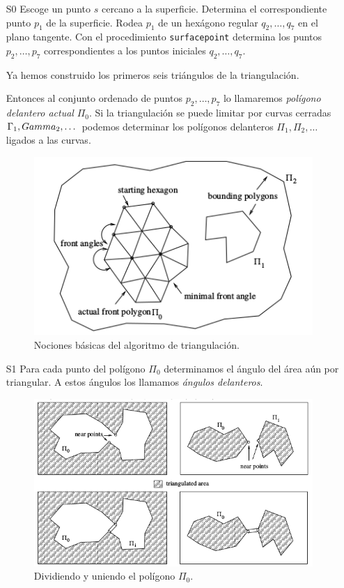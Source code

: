 \begin{enumerate}
	\item[S0] Escoge un punto $s$ cercano a la superficie. Determina el correspondiente punto $p_1$ de la superficie. Rodea $p_1$ de un hexágono regular $q_2, \dotso, q_7$ en el plano tangente. Con el procedimiento \texttt{surfacepoint} determina los puntos $p_2, \dotso, p_7$ correspondientes a los  puntos iniciales $q_2, \dotso, q_7$.
	\par Ya hemos construido los primeros seis triángulos de la triangulación.
	\par Entonces al conjunto ordenado de puntos $p_2, \dotso, p_7$ lo llamaremos{ \em polígono delantero actual} $\Pi_0$. Si la triangulación se puede limitar por curvas cerradas $\Gamma_1, \\Gamma_2,\dotso$ podemos determinar los polígonos delanteros $\Pi_1, \Pi_2, \dotso$ ligados a las curvas.
	
\begin{figure}[h]
	\centering
	\includegraphics[scale=0.7]{images/hartmann1.png}
	\caption{Nociones básicas del algoritmo de triangulación.}
\end{figure}	
	
	\item[S1] Para cada punto del polígono $\Pi_0$ determinamos el ángulo del área aún por triangular. A estos ángulos los llamamos{ \em ángulos delanteros}.
	
	\begin{figure}[h]
		\centering
		\includegraphics[scale=0.5]{images/hartmann2.png}
		\caption{Dividiendo y uniendo el polígono $\Pi_0$.}
	\end{figure}
	

\end{enumerate}
